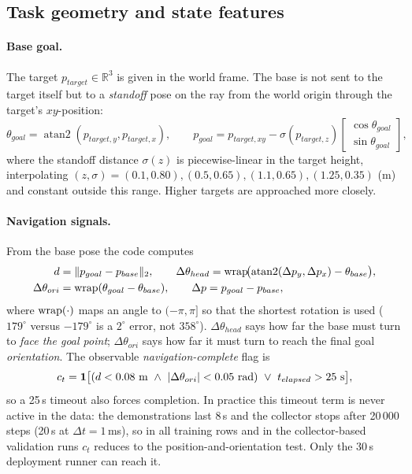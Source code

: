 \subsection{Task geometry and state features}
\label{dag:state}

\paragraph{Base goal.} The target $p_{target}\in\mathbb{R}^3$ is given in the world frame. The base is not sent to the target itself but to a \emph{standoff} pose on the ray from the world origin through the target's $xy$-position:
\begin{equation}
  \theta_{goal}=\operatorname{atan2}(p_{target,y},p_{target,x}),\qquad
  p_{goal}=p_{target,xy}-\sigma(p_{target,z})\begin{bmatrix}\cos\theta_{goal}\\ \sin\theta_{goal}\end{bmatrix},
  \label{dag:goalpose}
\end{equation}
where the standoff distance $\sigma(z)$ is piecewise-linear in the target height, interpolating $(z,\sigma)=(0.1,0.80),(0.5,0.65),(1.1,0.65),(1.25,0.35)$ (m) and constant outside this range. Higher targets are approached more closely.

\paragraph{Navigation signals.} From the base pose the code computes
\begin{equation}
\begin{aligned}
  d&=\lVert p_{goal}-p_{base}\rVert_2,\qquad
  \Delta\theta_{head}=\operatorname{wrap}\!\bigl(\operatorname{atan2}(\Delta p_y,\Delta p_x)-\theta_{base}\bigr),\\
  \Delta\theta_{ori}&=\operatorname{wrap}(\theta_{goal}-\theta_{base}),\qquad \Delta p=p_{goal}-p_{base},
\end{aligned}
\label{dag:geom}
\end{equation}
where $\operatorname{wrap}(\cdot)$ maps an angle to $(-\pi,\pi]$ so that the shortest rotation is used ($179^\circ$ versus $-179^\circ$ is a $2^\circ$ error, not $358^\circ$). $\Delta\theta_{head}$ says how far the base must turn to \emph{face the goal point}; $\Delta\theta_{ori}$ says how far it must turn to reach the final goal \emph{orientation}. The observable \emph{navigation-complete} flag is
\begin{equation}
  c_t=\dagone\bigl[(d<0.08\ \text{m}\ \wedge\ |\Delta\theta_{ori}|<0.05\ \text{rad})\ \vee\ t_{elapsed}>25\ \text{s}\bigr],
  \label{dag:nav}
\end{equation}
so a 25\,s timeout also forces completion. In practice this timeout term is never active in the data: the demonstrations last 8\,s and the collector stops after 20\,000 steps (20\,s at $\Delta t=1$\,ms), so in all training rows and in the collector-based validation runs $c_t$ reduces to the position-and-orientation test. Only the 30\,s deployment runner can reach it.


